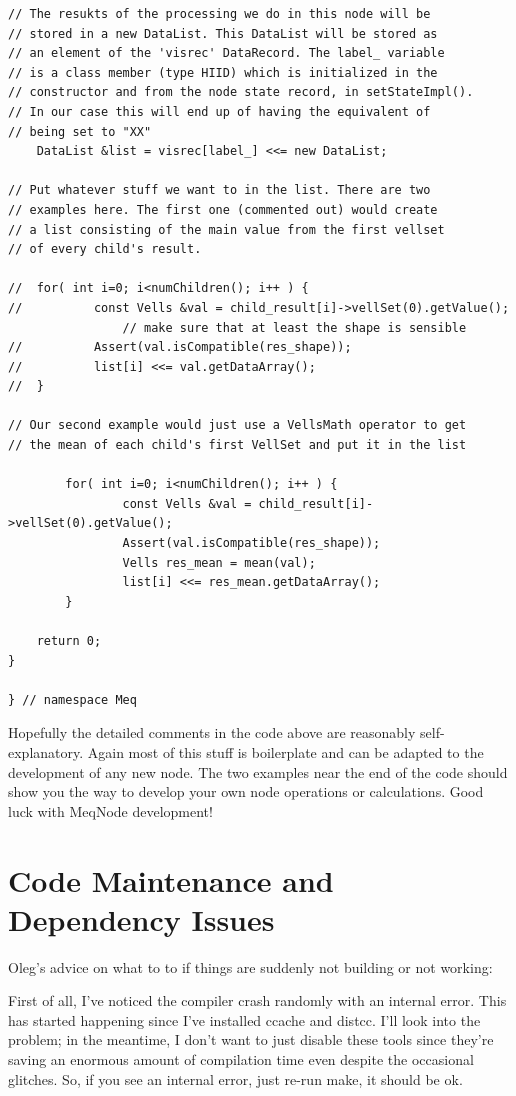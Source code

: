 \documentclass[10pt]{article}
\begin{document}
\begin{verbatim}
// The resukts of the processing we do in this node will be
// stored in a new DataList. This DataList will be stored as
// an element of the 'visrec' DataRecord. The label_ variable
// is a class member (type HIID) which is initialized in the 
// constructor and from the node state record, in setStateImpl().
// In our case this will end up of having the equivalent of
// being set to "XX" 
	DataList &list = visrec[label_] <<= new DataList;

// Put whatever stuff we want to in the list. There are two
// examples here. The first one (commented out) would create
// a list consisting of the main value from the first vellset 
// of every child's result.

//	for( int i=0; i<numChildren(); i++ ) {
//    		const Vells &val = child_result[i]->vellSet(0).getValue();
                // make sure that at least the shape is sensible
//    		Assert(val.isCompatible(res_shape));
//    		list[i] <<= val.getDataArray();
//	}

// Our second example would just use a VellsMath operator to get
// the mean of each child's first VellSet and put it in the list

        for( int i=0; i<numChildren(); i++ ) {
                const Vells &val = child_result[i]->vellSet(0).getValue();
                Assert(val.isCompatible(res_shape));
                Vells res_mean = mean(val);
                list[i] <<= res_mean.getDataArray();
        }

 	return 0;
}

} // namespace Meq
\end{verbatim}

Hopefully the detailed comments in the code above are reasonably
self-explanatory. Again most of this stuff is boilerplate and
can be adapted to the development of any new node. The two examples
near the end of the code should show you the way to develop
your own node operations or calculations. Good luck with MeqNode development!

\section {Code Maintenance and Dependency Issues} 
 
Oleg's advice on what to to if things are suddenly not building 
or not working: 

First of all, I've noticed the compiler crash randomly with an internal 
error. This has started happening since I've installed ccache and 
distcc. I'll look into the problem; in the meantime, I don't want to 
just disable these tools since they're saving an enormous amount of 
compilation time even despite the occasional glitches. So, if you see an 
internal error, just re-run make, it should be ok.
\end{document}
